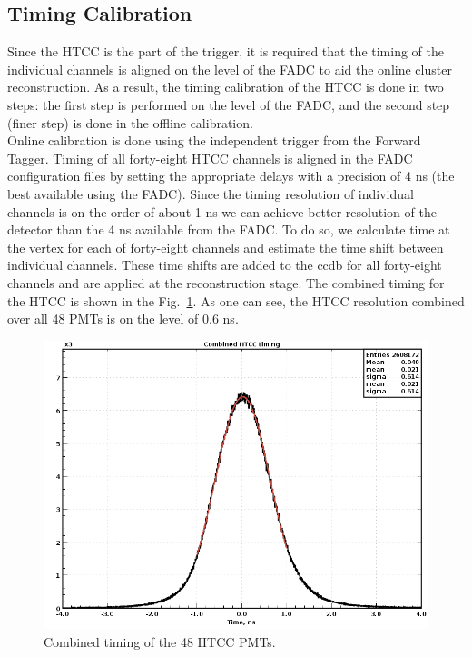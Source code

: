 \subsection{Timing Calibration} Since the HTCC is the part of the trigger, it is required that the timing of the individual channels is aligned on the level of the FADC to aid the online cluster reconstruction. As a result, the timing calibration of the HTCC is done in two steps: the first step is performed on the level of the FADC, and the second step (finer step) is done in the offline calibration. \\
\indent Online calibration is done using the independent trigger from the Forward Tagger. Timing of all forty-eight HTCC channels is aligned in the FADC configuration files by setting the appropriate delays with a precision of 4 ns (the best available using the FADC). Since the timing resolution of individual channels is on the order of about 1 ns we can achieve better resolution of the detector than the 4 ns available from the FADC. To do so, we calculate time at the vertex for each of forty-eight channels and estimate the time shift between individual channels. These time shifts are added to the ccdb for all forty-eight channels and are applied at the reconstruction stage. The combined timing for the HTCC is shown in the Fig.~\ref{fig:htcccombinedTimingResponce}. As one can see, the HTCC resolution combined over all 48 PMTs is on the level of 0.6 ns.
\begin{figure}[ht]
\centering
\includegraphics[width=0.95\linewidth]{images/deltaTime6.png}
\caption{Combined timing of the 48 HTCC PMTs.}
\label{fig:htcccombinedTimingResponce}
\end{figure}
